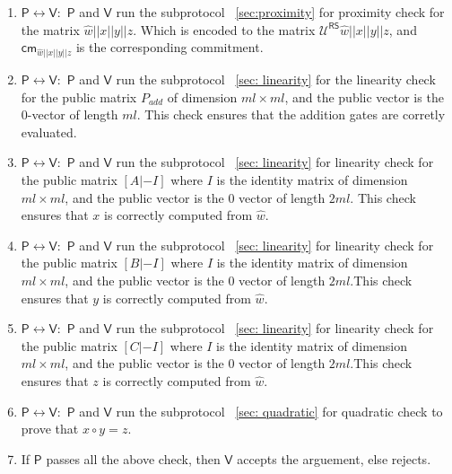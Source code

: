 \documentclass[runningheads]{llncs}
\def\prover{\mathsf{P}}
\def\verifier{\mathsf{V}}
\def\RS{\mathsf{RS}} %
\def\cm{\mathsf{cm}} %
\def\extwit{\hat{w}} %
\def\oracle{\mathcal{U}^{\RS}}
\begin{document}
	
	\begin{enumerate}
		\item $\prover \leftrightarrow \verifier: $ $\prover$ and $\verifier$ run the subprotocol ~\ref{sec:proximity} for proximity check for the matrix $\extwit||x||y||z$. Which is encoded to the matrix $\oracle{\extwit||x||y||z}$, and $\cm_{\extwit||x||y||z}$ is the corresponding commitment.
		
		\item $\prover \leftrightarrow \verifier: $ $\prover$ and $\verifier$ run the subprotocol ~\ref{sec: linearity} for the linearity check for the public matrix $P_{add}$ of dimension $ml\times ml$, and the public vector is the 0-vector of length $ml$. This check ensures that the addition gates are corretly evaluated.
		
		\item $\prover \leftrightarrow \verifier:$ $\prover$ and $\verifier$ run the subprotocol ~\ref{sec: linearity} for linearity check for the public matrix $[A|-I]$ where $I$ is the identity matrix of dimension $ml \times ml$, and the public vector is the 0 vector of length $2ml$. This check ensures that $x$ is correctly computed from $\extwit$.
		
		\item $\prover \leftrightarrow \verifier:$ $\prover$ and $\verifier$ run the subprotocol ~\ref{sec: linearity} for linearity check for the public matrix $[B|-I]$ where $I$ is the identity matrix of dimension $ml \times ml$, and the public vector is the 0 vector of length $2ml$.This check ensures that $y$ is correctly computed from $\extwit$.
		
		\item $\prover \leftrightarrow \verifier:$ $\prover$ and $\verifier$ run the subprotocol ~\ref{sec: linearity} for linearity check for the public matrix $[C|-I]$ where $I$ is the identity matrix of dimension $ml \times ml$, and the public vector is the 0 vector of length $2ml$.This check ensures that $z$ is correctly computed from $\extwit$.
		
		\item $\prover \leftrightarrow \verifier:$ $\prover$ and $\verifier$ run the subprotocol ~\ref{sec: quadratic} for quadratic check to prove that $x \circ y = z$.
		
		\item If $\prover$ passes all the above check, then $\verifier$ accepts the arguement, else rejects.
	\end{enumerate}
	
\end{document}
